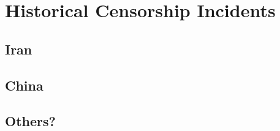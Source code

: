 %
\section{Historical Censorship Incidents} 
\label{section:historical}

\subsection{Iran}
\subsection{China}
\subsection{Others?}


